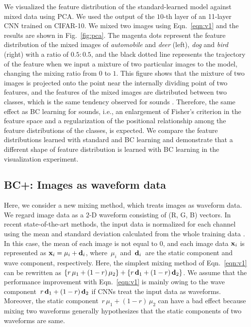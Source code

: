 \documentclass[10pt,twocolumn,letterpaper]{article}
\begin{document}
We visualized the feature distribution of the standard-learned model against mixed data using PCA. We used the output of the $10$-th layer of an 11-layer CNN trained on CIFAR-10. We mixed two images using Eqn.~\ref{eqn:v1} and the results are shown in Fig.~\ref{fig:pca}. The magenta dots represent the feature distribution of the mixed images of {\it automobile} and {\it deer} (left), {\it dog} and {\it bird} (right) with a ratio of $0.5:0.5$, and the black dotted line represents the trajectory of the feature when we input a mixture of two particular images to the model, changing the mixing ratio from $0$ to $1$. This figure shows that the mixture of two images is projected onto the point near the internally dividing point of two features, and the features of the mixed images are distributed between two classes, which is the same tendency observed for sounds \cite{tokozume2018learning}. Therefore, the same effect as BC learning for sounds, i.e., an enlargement of Fisher's criterion in the feature space and a regularization of the positional relationship among the feature distributions of the classes, is expected. We compare the feature distributions learned with standard and BC learning and demonstrate that a different shape of feature distribution is learned with BC learning in the visualization experiment.

\subsection{BC+: Images as waveform data}\label{v2}
Here, we consider a new mixing method, which treats images as waveform data. We regard image data as a $2$-D waveform consisting of (R, G, B) vectors. In recent state-of-the-art methods, the input data is normalized for each channel using the mean and standard deviation calculated from the whole training data \cite{xie2017aggregated, huang2017densely, gastaldi2017shake}. In this case, the mean of each image is not equal to $0$, and each image data ${\bf x}_i$ is represented as ${\bf x}_i = \mu_i + {\bf d}_i$, where $\, \mu_i \,$ and $\, {\bf d}_i \,$ are the static component and wave component, respectively. Here, the simplest mixing method of Eqn.~\ref{eqn:v1} can be rewritten as $\{r \, \mu_1 + (1-r) \, \mu_2\} +   \{r \, {\bf d}_1 + (1-r) \, {\bf d}_2\}$. We assume that the performance improvement with Eqn.~\ref{eqn:v1} is mainly owing to the wave component $\, r \, {\bf d}_1 + (1-r) \, {\bf d}_2$ if CNNs treat the input data as waveforms. Moreover, the static component $\,r \, \mu_1 + (1-r) \, \mu_2$ can have a bad effect because mixing two waveforms generally hypothesizes that the static components of two waveforms are same. 
\end{document}
